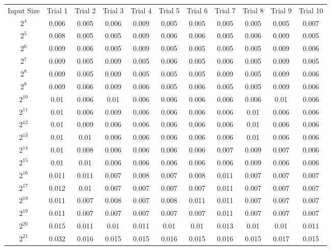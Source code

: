 \begin{center}
    \begin{tabular}{c|c|c|c|c|c|c|c|c|c|c}
     Input Size & Trial 1 & Trial 2 & Trial 3 & Trial 4 & Trial 5 & Trial 6 & Trial 7 & Trial 8 & Trial 9 & Trial 10 \\
$2^{4}$ & 0.006 & 0.005 & 0.006 & 0.009 & 0.005 & 0.005 & 0.005 & 0.005 & 0.005 & 0.007 \\ 
$2^{5}$ & 0.008 & 0.005 & 0.005 & 0.009 & 0.006 & 0.006 & 0.005 & 0.006 & 0.009 & 0.005 \\ 
$2^{6}$ & 0.009 & 0.006 & 0.005 & 0.009 & 0.005 & 0.005 & 0.005 & 0.005 & 0.009 & 0.006 \\ 
$2^{7}$ & 0.009 & 0.005 & 0.009 & 0.005 & 0.006 & 0.005 & 0.006 & 0.005 & 0.009 & 0.005 \\ 
$2^{8}$ & 0.009 & 0.005 & 0.009 & 0.005 & 0.005 & 0.005 & 0.009 & 0.005 & 0.009 & 0.006 \\ 
$2^{9}$ & 0.009 & 0.006 & 0.009 & 0.006 & 0.005 & 0.006 & 0.005 & 0.005 & 0.009 & 0.006 \\ 
$2^{10}$ & 0.01 & 0.006 & 0.01 & 0.006 & 0.006 & 0.006 & 0.006 & 0.006 & 0.01 & 0.006 \\ 
$2^{11}$ & 0.01 & 0.006 & 0.009 & 0.006 & 0.006 & 0.006 & 0.006 & 0.01 & 0.006 & 0.006 \\ 
$2^{12}$ & 0.01 & 0.009 & 0.006 & 0.006 & 0.006 & 0.006 & 0.006 & 0.01 & 0.006 & 0.006 \\ 
$2^{13}$ & 0.01 & 0.01 & 0.006 & 0.006 & 0.006 & 0.006 & 0.006 & 0.01 & 0.006 & 0.006 \\ 
$2^{14}$ & 0.01 & 0.008 & 0.006 & 0.006 & 0.006 & 0.006 & 0.007 & 0.009 & 0.007 & 0.006 \\ 
$2^{15}$ & 0.01 & 0.01 & 0.006 & 0.006 & 0.006 & 0.006 & 0.006 & 0.009 & 0.006 & 0.006 \\ 
$2^{16}$ & 0.011 & 0.011 & 0.007 & 0.008 & 0.007 & 0.008 & 0.011 & 0.007 & 0.007 & 0.007 \\ 
$2^{17}$ & 0.012 & 0.01 & 0.007 & 0.007 & 0.007 & 0.007 & 0.011 & 0.007 & 0.007 & 0.007 \\ 
$2^{18}$ & 0.011 & 0.007 & 0.008 & 0.007 & 0.008 & 0.011 & 0.011 & 0.007 & 0.007 & 0.007 \\ 
$2^{19}$ & 0.011 & 0.007 & 0.007 & 0.007 & 0.007 & 0.007 & 0.011 & 0.007 & 0.007 & 0.007 \\ 
$2^{20}$ & 0.015 & 0.011 & 0.01 & 0.011 & 0.01 & 0.01 & 0.013 & 0.01 & 0.01 & 0.011 \\ 
$2^{21}$ & 0.032 & 0.016 & 0.015 & 0.015 & 0.016 & 0.015 & 0.016 & 0.015 & 0.017 & 0.015 \\ 

\end{tabular}
\end{center}
